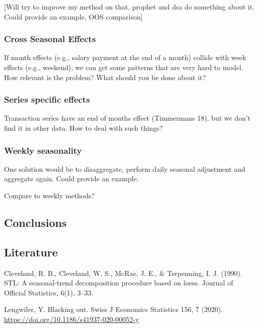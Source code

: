 {[}Will try to improve my method on that, prophet and dsa do something
about it. Could provide an example, OOS comparison{]}

\hypertarget{cross-seasonal-effects}{%
\subsubsection{Cross Seasonal Effects}\label{cross-seasonal-effects}}

If month effects (e.g., salary payment at the end of a month) collide
with week effects (e.g., weekend), we can get some patterns that are
very hard to model. How relevant is the problem? What should you be done
about it?

\hypertarget{series-specific-effects}{%
\subsubsection{Series specific effects}\label{series-specific-effects}}

Transaction series have an end of months effect (Timmermans 18), but we
don't find it in other data. How to deal with such things?

\hypertarget{weekly-seasonality}{%
\subsubsection{Weekly seasonality}\label{weekly-seasonality}}

One solution would be to disaggregate, perform daily seasonal adjustment
and aggregate again. Could provide an example.

Compare to weekly methods?

\hypertarget{conclusions-1}{%
\subsection{Conclusions}\label{conclusions-1}}

\hypertarget{literature}{%
\subsection{Literature}\label{literature}}

Cleveland, R. B., Cleveland, W. S., McRae, J. E., \& Terpenning, I. J.
(1990). STL: A seasonal-trend decomposition procedure based on loess.
Journal of Official Statistics, 6(1), 3--33.

Lengwiler, Y. Blacking out. Swiss J Economics Statistics 156, 7 (2020).
\url{https://doi.org/10.1186/s41937-020-00052-y}

